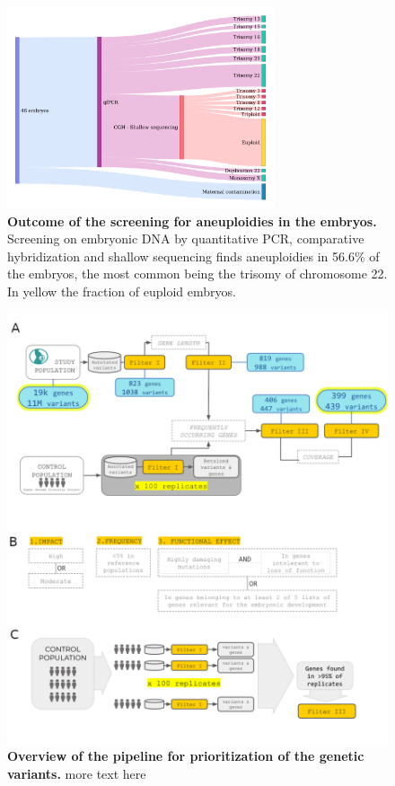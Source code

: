 \begin{figure}[h]
\centering
\includegraphics[width=0.7\textwidth]{fig/ibelieve.png}
\caption{\textbf{Outcome of the screening for aneuploidies in the embryos.} Screening on embryonic DNA by quantitative PCR, comparative hybridization and shallow sequencing finds aneuploidies in  56.6\% of the embryos, the most common being the trisomy of chromosome 22. In yellow the fraction of euploid embryos. }
\label{fig:presequencing}
\end{figure}

\begin{figure}[ht]
\centering
\includegraphics[width=\linewidth]{fig/pipe.png}
\caption{\textbf{Overview of the pipeline for prioritization of the genetic variants.} more text here } 
\label{fig:pipeline}
\end{figure}


